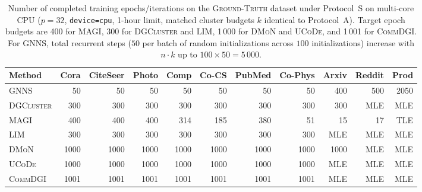 \documentclass[11pt,a4paper]{article}
\begin{document}
\begin{table}[H]
    \centering
    \caption{Number of completed training epochs/iterations on the \textsc{Ground-Truth} dataset under Protocol~S on multi-core CPU ($p=32$, \texttt{device=cpu}, 1-hour limit, matched cluster budgets $k$ identical to Protocol~A). Target epoch budgets are 400 for \textsc{MAGI}, 300 for \textsc{DGCluster} and \textsc{LIM}, 1\,000 for \textsc{DMoN} and \textsc{UCoDe}, and 1\,001 for \textsc{CommDGI}. For \textsc{GNNS}, total recurrent steps ($50$ per batch of random initializations across $100$ initializations) increase with $n \cdot k$ up to $100 \times 50 = 5\,000$.}
    \label{tab:iterations_cpu32}
    \vspace{0.5em}
    \small
    \setlength{\tabcolsep}{3.5pt}
    \begin{tabular*}{\textwidth}{@{\extracolsep{\fill}}l rrrrrrrrrr@{}}
        \toprule
        Method             & Cora & CiteSeer & Photo & Comp & Co-CS & PubMed & Co-Phys & Arxiv & Reddit & Prod \\
        \midrule
        \textsc{GNNS}      & 50   & 50       & 50    & 50   & 50    & 50     & 50      & 400   & 500    & 2050 \\
        \textsc{DGCluster} & 300  & 300      & 300   & 300  & 300   & 300    & 300     & 300   & MLE    & MLE \\
        \textsc{MAGI}      & 400  & 400      & 400   & 314  & 185   & 380    & 51      & 15    & 17     & TLE \\
        \textsc{LIM}       & 300  & 300      & 300   & 300  & 300   & 300    & 300     & MLE   & MLE    & MLE \\
        \textsc{DMoN}      & 1000 & 1000     & 1000  & 1000 & 1000  & 1000   & 1000    & 1000  & MLE    & MLE \\
        \textsc{UCoDe}     & 1000 & 1000     & 1000  & 1000 & 1000  & 1000   & 1000    & MLE   & MLE    & MLE \\
        \textsc{CommDGI}   & 1001 & 1001     & 1001  & 1001 & 1001  & 1001   & 1001    & MLE   & MLE    & MLE \\
        \bottomrule
    \end{tabular*}
\end{table}
\end{document}
